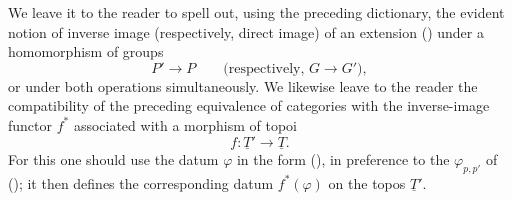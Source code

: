 We leave it to the reader to spell out, using the preceding dictionary,
the evident notion of inverse image (respectively, direct image) of an
extension () under a homomorphism of groups
\[
 P'\longrightarrow P
 \qquad\bigl(\text{respectively, }G\longrightarrow G'\bigr),
\]
or under both operations simultaneously. We likewise leave to the reader
the compatibility of the preceding equivalence of categories with the
inverse-image functor $f^*$ associated with a morphism of topoi
\[
 f:\underline T'\longrightarrow\underline T.
\]
For this one should use the datum $\varphi$ in the form (), in
preference to the $\varphi_{p,p'}$ of (); it then defines the
corresponding datum $f^*(\varphi)$ on the topos $\underline T'$.

